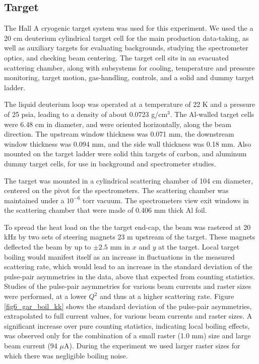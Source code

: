 \subsection{Target}\label{sec:target}

The Hall A cryogenic target system 
\cite{A-NIM} was used for this experiment. 
We used the a 20 cm deuterium cylindrical target cell 
for the main production data-taking, as well as auxiliary 
targets for evaluating backgrounds, studying the
spectrometer optics, and checking beam centering.
The target cell sits in an evacuated scattering chamber, 
along with subsystems for cooling,
temperature and pressure monitoring, target motion, gas-handling,
controls, and a solid and dummy target ladder.  

The liquid deuterium loop was operated at a temperature of 22 K and a
pressure of 25 psia, leading to a density of about 0.0723
g/cm$^3$. The Al-walled target cells were 6.48 cm in diameter, and
were oriented horizontally, along the beam direction. The upstream
window thickness was 0.071 mm, the downstream window thickness was
0.094 mm, and the side wall thickness was 0.18 mm. Also mounted on the
target ladder were solid thin targets of carbon, and aluminum dummy
target cells, for use in background and spectrometer studies.

The target was mounted in a cylindrical scattering chamber of 104 cm
diameter, centered on the pivot for the spectrometers. The scattering
chamber was maintained under a $10^{-6}$ torr vacuum. The
spectrometers view exit windows in the scattering chamber that were
made of 0.406 mm thick Al foil.

To spread the heat load on the the target end-cap,
the beam was rastered at 20 kHz by two sets of
steering magnets 23 m upstream of the target. These magnets deflected
the beam by up to $\pm 2.5$ mm in $x$ and $y$ at
the target.  
Local target boiling would manifest itself as an 
increase in fluctuations in the
measured scattering rate, which would lead to an increase in the
standard deviation of the pulse-pair asymmetries in the data, above
that expected from counting statistics. Studies of the pulse-pair
asymmetries for various beam currents and raster sizes were performed,
at a lower $Q^2$ and thus at a higher scattering rate. Figure
\ref{fig6_gar_boil_kk} shows the standard deviation of the 
pulse-pair asymmetries, extrapolated to full current values, for
various beam currents and raster sizes. A significant increase over
pure counting statistics, indicating local boiling effects, was
observed only for the combination of a small raster (1.0 mm) size and
large beam current (94 $\mu$A).  During the experiment we used
larger raster sizes for which there was negligible boiling noise.
